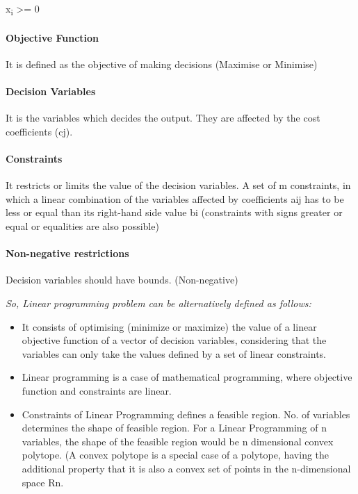 \documentclass[]{article}
\let\oldparagraph\paragraph
\renewcommand{\paragraph}[1]{\oldparagraph{#1}\mbox{}}
\begin{document}
x\textsubscript{i} \textgreater{}= 0

\paragraph{Objective Function}\label{objective-function}

It is defined as the objective of making decisions (Maximise or
Minimise)

\paragraph{Decision Variables}\label{decision-variables}

It is the variables which decides the output. They are affected by the
cost coefficients (cj).

\paragraph{Constraints}\label{constraints}

It restricts or limits the value of the decision variables. A set of m
constraints, in which a linear combination of the variables affected by
coefficients aij has to be less or equal than its right-hand side value
bi (constraints with signs greater or equal or equalities are also
possible)

\paragraph{Non-negative restrictions}\label{non-negative-restrictions}

Decision variables should have bounds. (Non-negative)

\emph{So, Linear programming problem can be alternatively defined as
follows:}

\begin{itemize}
\item
  It consists of optimising (minimize or maximize) the value of a linear
  objective function of a vector of decision variables, considering that
  the variables can only take the values defined by a set of linear
  constraints.
\item
  Linear programming is a case of mathematical programming, where
  objective function and constraints are linear.
\item
  Constraints of Linear Programming defines a feasible region. No. of
  variables determines the shape of feasible region. For a Linear
  Programming of n variables, the shape of the feasible region would be
  n dimensional convex polytope. (A convex polytope is a special case of
  a polytope, having the additional property that it is also a convex
  set of points in the n-dimensional space Rn.
\end{itemize}
\end{document}

